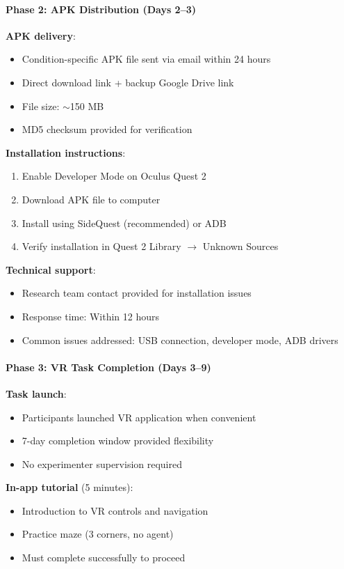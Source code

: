 \documentclass[12pt]{article}
\begin{document}
\paragraph{Phase 2: APK Distribution (Days 2--3)}

\textbf{APK delivery}:
\begin{itemize}
    \item Condition-specific APK file sent via email within 24 hours
    \item Direct download link + backup Google Drive link
    \item File size: $\sim$150 MB
    \item MD5 checksum provided for verification
\end{itemize}

\textbf{Installation instructions}:
\begin{enumerate}
    \item Enable Developer Mode on Oculus Quest 2
    \item Download APK file to computer
    \item Install using SideQuest (recommended) or ADB
    \item Verify installation in Quest 2 Library $\rightarrow$ Unknown Sources
\end{enumerate}

\textbf{Technical support}:
\begin{itemize}
    \item Research team contact provided for installation issues
    \item Response time: Within 12 hours
    \item Common issues addressed: USB connection, developer mode, ADB drivers
\end{itemize}

\paragraph{Phase 3: VR Task Completion (Days 3--9)}

\textbf{Task launch}:
\begin{itemize}
    \item Participants launched VR application when convenient
    \item 7-day completion window provided flexibility
    \item No experimenter supervision required
\end{itemize}

\textbf{In-app tutorial} (5 minutes):
\begin{itemize}
    \item Introduction to VR controls and navigation
    \item Practice maze (3 corners, no agent)
    \item Must complete successfully to proceed
\end{itemize}
\end{document}
